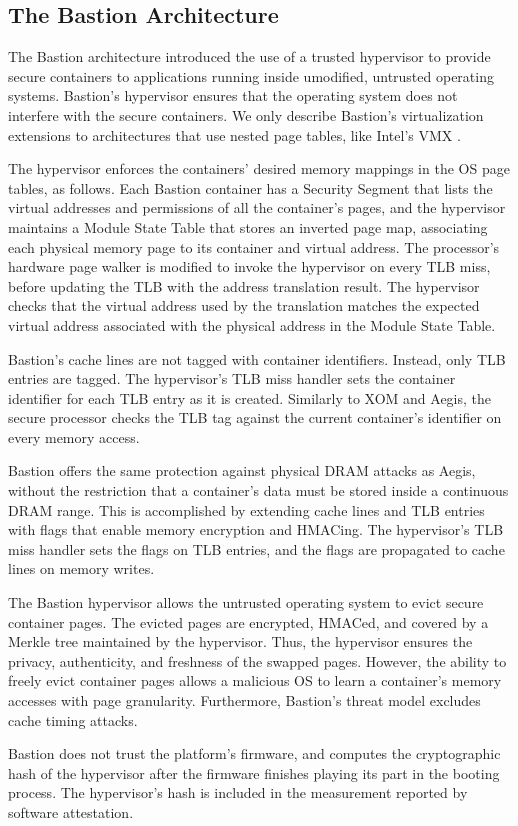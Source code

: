 \subsection{The Bastion Architecture}

The Bastion architecture \cite{champagne2010bastion} introduced the use of a
trusted hypervisor to provide secure containers to applications running inside
umodified, untrusted operating systems. Bastion's hypervisor ensures that the
operating system does not interfere with the secure containers. We only
describe Bastion's virtualization extensions to architectures that use nested
page tables, like Intel's VMX \cite{uhlig2005vmx}.

The hypervisor enforces the containers' desired memory mappings in the OS page
tables, as follows. Each Bastion container has a Security Segment that lists
the virtual addresses and permissions of all the container's pages, and the
hypervisor maintains a Module State Table that stores an inverted page map,
associating each physical memory page to its container and virtual address. The
processor's hardware page walker is modified to invoke the hypervisor on every
TLB miss, before updating the TLB with the address translation result. The
hypervisor checks that the virtual address used by the translation matches the
expected virtual address associated with the physical address in the Module
State Table.

Bastion's cache lines are not tagged with container identifiers. Instead, only
TLB entries are tagged. The hypervisor's TLB miss handler sets the container
identifier for each TLB entry as it is created. Similarly to XOM and Aegis, the
secure processor checks the TLB tag against the current container's identifier
on every memory access.

Bastion offers the same protection against physical DRAM attacks as Aegis,
without the restriction that a container's data must be stored inside a
continuous DRAM range. This is accomplished by extending cache lines and TLB
entries with flags that enable memory encryption and HMACing. The hypervisor's
TLB miss handler sets the flags on TLB entries, and the flags are propagated to
cache lines on memory writes.

The Bastion hypervisor allows the untrusted operating system to evict secure
container pages. The evicted pages are encrypted, HMACed, and covered by a
Merkle tree maintained by the hypervisor. Thus, the hypervisor ensures the
privacy, authenticity, and freshness of the swapped pages. However, the ability
to freely evict container pages allows a malicious OS to learn a container's
memory accesses with page granularity. Furthermore, Bastion's threat model
excludes cache timing attacks.

Bastion does not trust the platform's firmware, and computes the cryptographic
hash of the hypervisor after the firmware finishes playing its part in the
booting process. The hypervisor's hash is included in the measurement reported
by software attestation.
